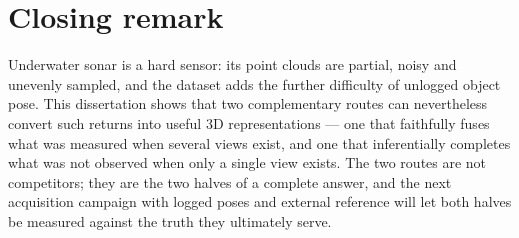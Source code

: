 \section{Closing remark}
\label{sec:conc_closing}

Underwater sonar is a hard sensor: its point clouds are partial, noisy and
unevenly sampled, and the \suop{} dataset adds the further difficulty of
unlogged object pose. This dissertation shows that two complementary routes
can nevertheless convert such returns into useful 3D representations --- one
that faithfully fuses what was measured when several views exist, and one that
inferentially completes what was not observed when only a single view exists.
The two routes are not competitors; they are the two halves of a complete
answer, and the next acquisition campaign with logged poses and external
reference will let both halves be measured against the truth they ultimately
serve.
